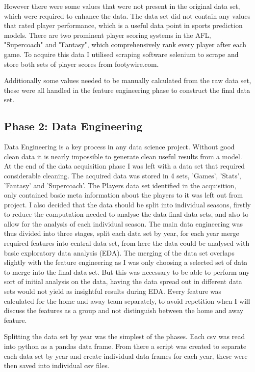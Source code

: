 \documentclass{imc-inf}
\begin{document}
	However there were some values that were not present in the original data set, which were required to enhance the data. The data set did not contain any values that rated player performance, which is a useful data point in sports prediction models. There are two prominent player scoring systems in the AFL, "Supercoach" and "Fantasy", which comprehensively rank every player after each game. To acquire this data I utilised scraping software selenium to scrape and store both sets of player scores from footywire.com. 
	
	Additionally some values needed to be manually calculated from the raw data set, these were all handled in the feature engineering phase to construct the final data set.
	
	\subsection{Phase 2: Data Engineering}
	Data Engineering is a key process in any data science project. Without good clean data it is nearly impossible to generate clean useful results from a model. 
	At the end of the data acquisition phase I was left with a data set that required considerable cleaning. The acquired data was stored in 4 sets, 'Games', 'Stats', 'Fantasy' and 'Supercoach'. The Players data set identified in the acquisition, only contained basic meta information about the players to it was left out from project. I also decided that the data should be split into individual seasons, firstly to reduce the computation needed to analyse the data final data sets, and also to allow for the analysis of each individual season. The main data engineering was thus divided into three stages, split each data set by year, for each year merge required features into central data set, from here the data could be analysed with basic exploratory data analysis (EDA). The merging of the data set overlaps slightly with the feature engineering as I was only choosing a selected set of data to merge into the final data set. But this was necessary to be able to perform any sort of initial analysis on the data, having the data spread out in different data sets would not yield as insightful results during EDA. Every feature was calculated for the home and away team separately, to avoid repetition when I will discuss the features as a group and not distinguish between the home and away feature.
	
	Splitting the data set by year was the simplest of the phases. Each csv was read into python as a pandas data frame. From there a script was created to separate each data set by year and create individual data frames for each year, these were then saved into individual csv files.
	
\end{document}
